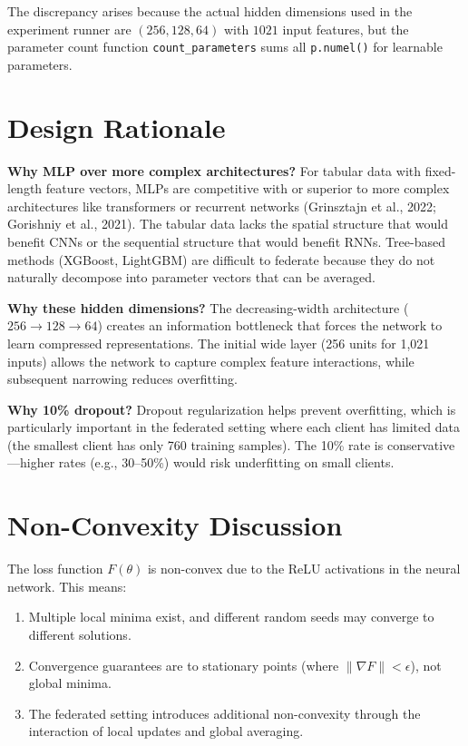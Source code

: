 \documentclass[11pt,a4paper]{report}
\begin{document}
The discrepancy arises because the actual hidden dimensions used in the experiment runner are $(256, 128, 64)$ with $1021$ input features, but the parameter count function \texttt{count\_parameters} sums all \texttt{p.numel()} for learnable parameters.

\section{Design Rationale}

\textbf{Why MLP over more complex architectures?} For tabular data with fixed-length feature vectors, MLPs are competitive with or superior to more complex architectures like transformers or recurrent networks (Grinsztajn et al., 2022; Gorishniy et al., 2021). The tabular data lacks the spatial structure that would benefit CNNs or the sequential structure that would benefit RNNs. Tree-based methods (XGBoost, LightGBM) are difficult to federate because they do not naturally decompose into parameter vectors that can be averaged.

\textbf{Why these hidden dimensions?} The decreasing-width architecture ($256 \to 128 \to 64$) creates an information bottleneck that forces the network to learn compressed representations. The initial wide layer (256 units for 1,021 inputs) allows the network to capture complex feature interactions, while subsequent narrowing reduces overfitting.

\textbf{Why 10\% dropout?} Dropout regularization helps prevent overfitting, which is particularly important in the federated setting where each client has limited data (the smallest client has only 760 training samples). The 10\% rate is conservative---higher rates (e.g., 30--50\%) would risk underfitting on small clients.

\section{Non-Convexity Discussion}

The loss function $F(\theta)$ is non-convex due to the ReLU activations in the neural network. This means:
\begin{enumerate}[leftmargin=2em]
\item Multiple local minima exist, and different random seeds may converge to different solutions.
\item Convergence guarantees are to stationary points (where $\|\nabla F\| < \epsilon$), not global minima.
\item The federated setting introduces additional non-convexity through the interaction of local updates and global averaging.
\end{enumerate}
\end{document}
